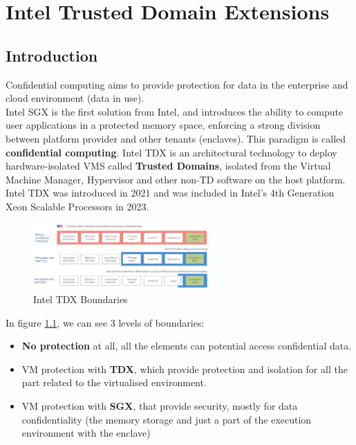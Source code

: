 \chapter{Intel Trusted Domain Extensions}

\section{Introduction}

Confidential computing aims to provide protection for data in the
enterprise and cloud environment (data in use). \\ 
Intel SGX is the first solution from Intel, and introduces the ability
to compute user applications in a protected memory space, enforcing a
strong division between platform provider and other tenants
(enclaves). This paradigm is called \textbf{confidential computing}.
Intel TDX is an architectural technology to deploy hardware-isolated
VMS called \textbf{Trusted Domains}, isolated from the Virtual Machine
Manager, Hypervisor and other non-TD software on the host platform. \\ 
Intel TDX was introduced in 2021 and was included in Intel's 4th
Generation Xeon Scalable Processors in 2023.

\begin{figure}[H]
  \centering
  \includegraphics[width=0.6\textwidth]{img/tdx-boundaries.png}
  \caption{Intel TDX Boundaries}
  \label{fig:tdx boundaries}
\end{figure}

In figure \ref{fig:tdx boundaries}, we can see 3 levels of boundaries:
\begin{itemize}
  \item \textbf{No protection} at all, all the elements can
    potential access confidential data.
  \item VM protection with \textbf{TDX}, which provide protection
    and isolation for all the part related to the virtualised
    environment.
  \item VM protection with \textbf{SGX}, that provide security,
    mostly for data confidentiality (the memory storage and
    just a part of the execution environment with the enclave)
\end{itemize}


